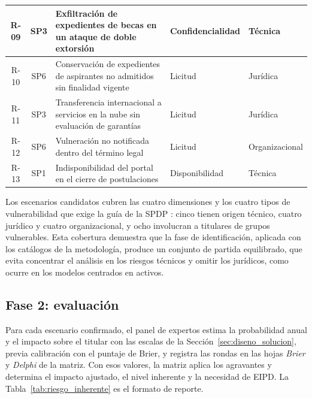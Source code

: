 \begin{table}[htbp]
\begin{tabularx}{\textwidth}{|c|c|L|>{\raggedright\arraybackslash}p{2.0cm}|>{\raggedright\arraybackslash}p{1.9cm}|}
    \hline
    R-09 & SP3 & Exfiltración de expedientes de becas en un ataque de doble extorsión & Confidencialidad & Técnica \\
    \hline
    R-10 & SP6 & Conservación de expedientes de aspirantes no admitidos sin finalidad vigente & Licitud & Jurídica \\
    \hline
    R-11 & SP3 & Transferencia internacional a servicios en la nube sin evaluación de garantías & Licitud & Jurídica \\
    \hline
    R-12 & SP6 & Vulneración no notificada dentro del término legal & Licitud & Organizacional \\
    \hline
    R-13 & SP1 & Indisponibilidad del portal en el cierre de postulaciones & Disponibilidad & Técnica \\
    \hline
  \end{tabularx}
  \raggedright
\end{table}

Los escenarios candidatos cubren las cuatro dimensiones y los cuatro tipos de vulnerabilidad que exige la guía de la SPDP \cite{spdp2026guiav2}: cinco tienen origen técnico, cuatro jurídico y cuatro organizacional, y ocho involucran a titulares de grupos vulnerables. Esta cobertura demuestra que la fase de identificación, aplicada con los catálogos de la metodología, produce un conjunto de partida equilibrado, que evita concentrar el análisis en los riesgos técnicos y omitir los jurídicos, como ocurre en los modelos centrados en activos.

\subsection{Fase 2: evaluación}

Para cada escenario confirmado, el panel de expertos estima la probabilidad anual y el impacto sobre el titular con las escalas de la Sección~\ref{sec:diseno_solucion}, previa calibración con el puntaje de Brier, y registra las rondas en las hojas \textit{Brier} y \textit{Delphi} de la matriz. Con esos valores, la matriz aplica los agravantes y determina el impacto ajustado, el nivel inherente y la necesidad de EIPD. La Tabla~\ref{tab:riesgo_inherente} es el formato de reporte.

